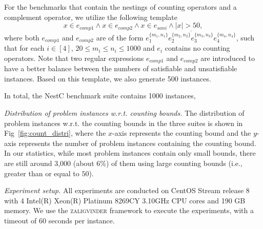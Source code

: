 For the benchmarks that contain the nestings of counting operators and a complement operator, we utilize the following template
\[x \in e_{comp1} \wedge x \in e_{comp2} \wedge x \in e_{sani} \wedge |x| > 50, \]
where both $e_{comp1}$ and $e_{comp2}$ are of the form $\overline{e_1^{\{m_1,n_1\}}e_2^{\{m_2,n_2\}}e_3^{\{m_3,n_3\}} e_4^{\{m_4, n_4\}}}$, such that for each $i \in [4]$, $20 \leq m_i\leq n_i\leq 1000$  and $e_i$ contains no counting operators. Note that two regular expressions $e_{comp1} $ and $e_{comp2}$ are introduced to have a better balance between the numbers of satisfiable and unsatisfiable instances. Based on this template, we also generate 500 instances. 

In total, the NestC benchmark suite contains 1000  instances,  


\medskip
\noindent
\emph{Distribution of problem instances w.r.t. counting bounds. }
The distribution of problem instances w.r.t. the counting bounds in the three suites is shown in Fig~\ref{fig:count_distri}, where the $x$-axis represents the counting bound and the $y$-axis represents the number of problem instances containing the counting bound. 
In our statistics, while most problem instances contain only small bounds, there are still around 3,000  (about 6\%) of them using large counting bounds (i.e., greater than or equal to $50$).

\medskip
\noindent
\emph{Experiment setup.}
All experiments are conducted on CentOS Stream release 8 with 4 Intel(R) Xeon(R) Platinum 8269CY 3.10GHz CPU cores and 190 GB memory. We use the \textsc{zaligvinder} framework \cite{zaligvinder_2021} to execute the experiments, with a timeout of 60 seconds per instance.



